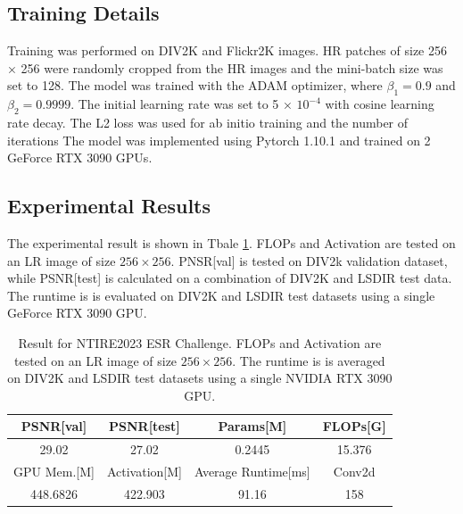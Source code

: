 \documentclass[10pt,twocolumn,letterpaper]{article}
\begin{document}
 



\subsection{Training Details}
Training was performed on DIV2K \cite{ref10} and Flickr2K \cite{ref11} images. HR patches of size 256 × 256 were randomly cropped from the HR images and the mini-batch size was set to 128. The model was trained with the ADAM optimizer\cite{ref12}, where $\beta_1 =0.9$ and $\beta_2 =0.9999$. The initial learning rate was set to 5 × $10^{-4}$ with cosine learning rate decay. The L2 loss was used for ab initio training and the number of iterations The model was implemented using Pytorch 1.10.1 and trained on 2 GeForce RTX 3090 GPUs.


\subsection{Experimental Results}
The experimental result is shown in Tbale \ref{tab:result}. FLOPs and Activation are tested on an LR image of size $256\times 256$. PNSR[val] is tested on DIV2k validation dataset, while PSNR[test] is calculated on a combination of DIV2K and LSDIR test data. The runtime is is evaluated on DIV2K and LSDIR test datasets using a single GeForce RTX 3090 GPU. 

 \begin{table}[t]
	\centering
	\begin{tabular}{|c|c|c|c|}\hline
		PSNR[val]&PSNR[test]& Params[M]& FLOPs[G] \\
		\hline
		
		29.02&27.02&  0.2445&15.376\\
		\hline
		 GPU Mem.[M] & Activation[M]&Average Runtime[ms]&Conv2d \\
		\hline
		
		448.6826&422.903&91.16&158\\
		\hline
	\end{tabular}
	\caption{Result for NTIRE2023 ESR Challenge. FLOPs and Activation are tested on an LR image of size $256\times 256$. The runtime is is averaged on DIV2K and LSDIR test datasets using a single NVIDIA RTX 3090 GPU.}
	\label{tab:result}
 \end{table}
\end{document}
